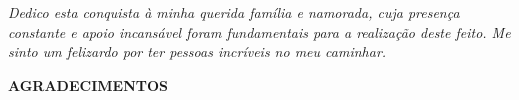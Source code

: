 \vspace*{\fill}

\vspace*{\fill} %

\hspace*{8em}
{\raggedleft
\textit{Dedico esta conquista à minha querida família e namorada, cuja presença constante e apoio incansável foram fundamentais para a realização deste feito. 
Me sinto um felizardo por ter pessoas incríveis no meu caminhar.
}
\par} 

\vspace*{\fill} %

\newpage

\begin{center}
\textbf{AGRADECIMENTOS}
\end{center}

\lipsum[1-3]

